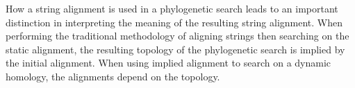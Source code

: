 \documentclass{bmcart}
\begin{document}
How a string alignment is used in a phylogenetic search leads to an important distinction in interpreting the meaning of the resulting string alignment.
When performing the traditional methodology of aligning strings then searching on the static alignment, the resulting topology of the phylogenetic search is implied by the initial alignment.
When using implied alignment to search on a dynamic homology, the alignments depend on the topology.




\end{document}
